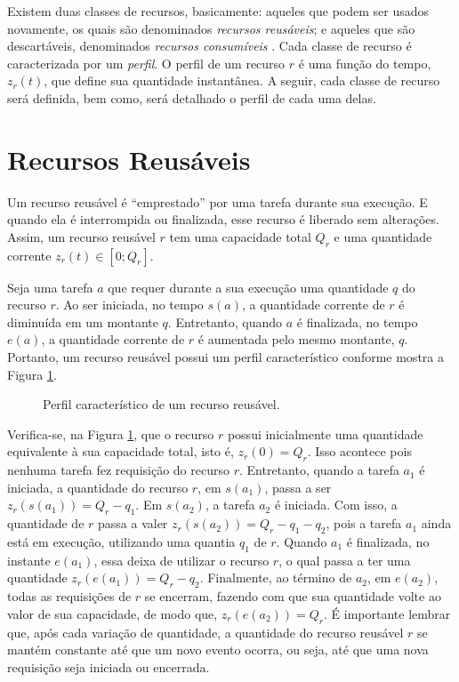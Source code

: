     Existem duas classes de recursos, basicamente: aqueles que podem ser usados novamente, os quais são denominados \textit{recursos reusáveis}; e aqueles que são descartáveis, denominados \textit{recursos consumíveis} \cite{ref:ghallab2004automated}. Cada classe de recurso é caracterizada por um \textit{perfil}. O perfil de um recurso $r$ é uma função do tempo, $z_r(t)$, que define sua quantidade instantânea. A seguir, cada classe de recurso será definida, bem como, será detalhado o perfil de cada uma delas.
    
    \section{Recursos Reusáveis} \label{sec:recurso_reusavel}
    
        Um recurso reusável é ``emprestado'' por uma tarefa durante sua execução. E quando ela é interrompida ou finalizada, esse recurso é liberado sem alterações. Assim, um recurso reusável $r$ tem uma capacidade total $Q_r$ e uma quantidade corrente $z_r(t) \in [0; Q_r]$. 
        
        Seja uma tarefa $a$ que requer durante a sua execução uma quantidade $q$ do recurso $r$. Ao ser iniciada, no tempo $s(a)$, a quantidade corrente de $r$ é diminuída em um montante $q$. Entretanto, quando $a$ é finalizada, no tempo $e(a)$, a quantidade corrente de $r$ é aumentada pelo mesmo montante, $q$. Portanto, um recurso reusável possui um perfil característico conforme mostra a Figura \ref{fig:recurso_reusavel}.
        
        \begin{figure}[htb]
            \centering
            
            \caption{Perfil característico de um recurso reusável.} \label{fig:recurso_reusavel}
        \end{figure}
        
        Verifica-se, na Figura \ref{fig:recurso_reusavel}, que o recurso $r$ possui inicialmente uma quantidade equivalente à sua capacidade total, isto é, $z_r(0) = Q_r$. Isso acontece pois nenhuma tarefa fez requisição do recurso $r$. Entretanto, quando a tarefa $a_1$ é iniciada, a quantidade do recurso $r$, em $s(a_1)$, passa a ser $z_r(s(a_1)) = Q_r - q_1$. Em $s(a_2)$, a tarefa $a_2$ é iniciada. Com isso, a quantidade de $r$ passa a valer $z_r(s(a_2)) = Q_r - q_1 - q_2$, pois a tarefa $a_1$ ainda está em execução, utilizando uma quantia $q_1$ de $r$. Quando $a_1$ é finalizada, no instante $e(a_1)$, essa deixa de utilizar o recurso $r$, o qual passa a ter uma quantidade $z_r(e(a_1)) = Q_r - q_2$. Finalmente, ao término de $a_2$, em $e(a_2)$, todas as requisições de $r$ se encerram, fazendo com que sua quantidade volte ao valor de sua capacidade, de modo que, $z_r(e(a_2)) = Q_r$. É importante lembrar que, após cada variação de quantidade, a quantidade do recurso reusável $r$ se mantém constante até que um novo evento ocorra, ou seja, até que uma nova requisição seja iniciada ou encerrada.
    
